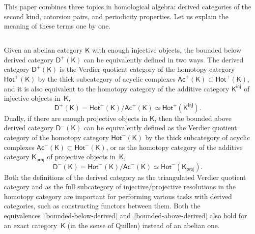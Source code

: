 \documentclass[12pt,a4paper]{amsart}
\newcommand{\+}{\nobreakdash-}
\renewcommand{\:}{\colon}
\newcommand{\sD}{\mathsf D}
\newcommand{\sK}{\mathsf K}
\newcommand{\Hot}{\mathsf{Hot}}
\newcommand{\Ac}{\mathsf{Ac}}
\newcommand{\proj}{\mathsf{proj}}
\newcommand{\inj}{\mathsf{inj}}
\theoremstyle{plain}
\theoremstyle{definition}
\begin{document}
 This paper combines three topics in homological algebra: derived
categories of the second kind, cotorsion pairs, and periodicity
properties.
 Let us explain the meaning of these terms one by one.

\subsection{{}} \label{introd-derived-subsecn}
 Given an abelian category $\sK$ with enough injective objects,
the bounded below derived category $\sD^+(\sK)$ can be equivalently
defined in two ways.
 The derived category $\sD^+(\sK)$ is the Verdier quotient category of
the homotopy category $\Hot^+(\sK)$ by the thick subcategory of
acyclic complexes $\Ac^+(\sK)\subset\Hot^+(\sK)$, and it is also 
equivalent to the homotopy category of the additive category
$\sK^\inj$ of injective objects in~$\sK$,
\begin{equation} \label{bounded-below-derived}
 \sD^+(\sK)=\Hot^+(\sK)/\Ac^+(\sK)\simeq\Hot^+(\sK^\inj).
\end{equation}
 Dually, if there are enough projective objects in $\sK$, then
the bounded above derived category $\sD^-(\sK)$ can be equivalently
defined as the Verdier quotient category of the homotopy category
$\Hot^-(\sK)$ by the thick subcategory of acyclic complexes
$\Ac^-(\sK)\subset\Hot^-(\sK)$, or as the homotopy category of
the additive category $\sK_\proj$ of projective objects in~$\sK$,
\begin{equation} \label{bounded-above-derived}
 \sD^-(\sK)=\Hot^-(\sK)/\Ac^-(\sK)\simeq\Hot^-(\sK_\proj).
\end{equation}
 Both the definitions of the derived category as the triangulated
Verdier quotient category and as the full subcategory of 
injective/projective resolutions in the homotopy category are important
for performing various tasks with derived categories, such as
constructing functors between them.
 Both the equivalences~\eqref{bounded-below-derived}
and~\eqref{bounded-above-derived} also hold for an exact category~$\sK$
(in the sense of Quillen) instead of an abelian one.
\end{document}

